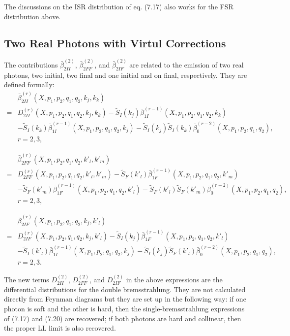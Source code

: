 The discussions on the ISR distribution of eq. (7.17) also works for the FSR distribution above. 

\subsection{Two Real Photons with Virtul Corrections}
The contributions $\bar{\beta}_{2II}^{(2)}$, $\bar{\beta}_{2FF}^{(2)}$, and $\bar{\beta}_{2IF}^{(2)}$ are related to the emission of two real photons, two initial, two final and one initial and on final, respectively. They are defined formally:
\begin{align}
&\bar{\beta}_{2II}^{(r)}(X,p_1,p_2,q_1,q_2,k_j,k_k)\nonumber\\
=&D_{2II}^{(r)}(X,p_1,p_2,q_1,q_2,k_j,k_k)-\tilde{S}_I(k_j)\bar{\beta}_{1I}^{(r-1)}(X,p_1,p_2,q_1,q_2,k_k)\nonumber\\&-\tilde{S}_I(k_k)\bar{\beta}_{1I}^{(r-1)}(X,p_1,p_2,q_1,q_2,k_j)-\tilde{S}_I(k_j)\tilde{S}_I(k_k)\bar{\beta}_{0}^{(r-2)}(X,p_1,p_2,q_1,q_2),\nonumber\\&r=2,3,
\end{align}

\begin{align}
&\bar{\beta}_{2FF}^{(r)}(X,p_1,p_2,q_1,q_2,k'_l,k'_m)\nonumber\\
=&D_{2FF}^{(r)}(X,p_1,p_2,q_1,q_2,k'_l,k'_m)-\tilde{S}_F(k'_l)\bar{\beta}_{1F}^{(r-1)}(X,p_1,p_2,q_1,q_2,k'_m)\nonumber\\&-\tilde{S}_F(k'_m)\bar{\beta}_{1F}^{(r-1)}(X,p_1,p_2,q_1,q_2,k'_l)-\tilde{S}_F(k'_l)\tilde{S}_F(k'_m)\bar{\beta}_{0}^{(r-2)}(X,p_1,p_2,q_1,q_2),\nonumber\\&r=2,3,
\end{align}

\begin{align}
&\bar{\beta}_{2IF}^{(r)}(X,p_1,p_2,q_1,q_2,k_j,k'_l)\nonumber\\
=&D_{2IF}^{(r)}(X,p_1,p_2,q_1,q_2,k_j,k'_l)-\tilde{S}_I(k_j)\bar{\beta}_{1F}^{(r-1)}(X,p_1,p_2,q_1,q_2,k'_l)\nonumber\\&-\tilde{S}_I(k'_l)\bar{\beta}_{1I}^{(r-1)}(X,p_1,p_2,q_1,q_2,k_j)-\tilde{S}_I(k_j)\tilde{S}_F(k'_l)\bar{\beta}_{0}^{(r-2)}(X,p_1,p_2,q_1,q_2),\nonumber\\&r=2,3.
\end{align}

The new terms $D_{2II}^{(2)}$, $D_{2FF}^{(2)}$, and $D_{2IF}^{(2)}$ in the above expressions are the differential distributions for the double bremsstrahlung. They are not calculated directly from Feynman diagrams but they are set up in the following way: if one photon is soft and the other is hard, then the single-bremsstrahlung expressions of (7.17) and (7.20) are recovered; if both photons are hard and collinear, then the proper LL limit is also recovered. 

